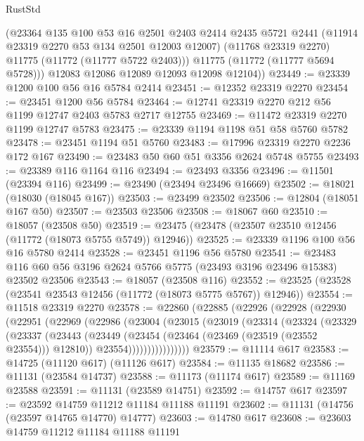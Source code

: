 \begin{lexlean}{RustStd}
\begin{coremodule}
          (@23364
            @135
            @100
            @53
            @16
            @2501
            @2403
            @2414
            @2435
            @5721
            @2441
            (@11914 @23319 @2270 @53 @134 @2501 @12003 @12007)
            (@11768 @23319 @2270)
            @11775
            (@11772 (@11777 @5722 @2403)))
          @11775
          (@11772 (@11777 @5694 @5728)))
        @12083
        @12086
        @12089
        @12093
        @12098
        @12104))
@23449 := @23339 @1200 @100 @56 @16 @5784 @2414
@23451 := @12352 @23319 @2270
@23454 := @23451 @1200 @56 @5784
@23464 := @12741 @23319 @2270 @212 @56 @1199 @12747 @2403 @5783 @2717 @12755
@23469 := @11472 @23319 @2270 @1199 @12747 @5783
@23475 := @23339 @1194 @1198 @51 @58 @5760 @5782
@23478 := @23451 @1194 @51 @5760
@23483 := @17996 @23319 @2270 @2236 @172 @167
@23490 := @23483 @50 @60 @51 @3356 @2624 @5748 @5755
@23493 := @23389 @116 @1164 @116
@23494 := @23493 @3356
@23496 := @11501 (@23394 @116)
@23499 := @23490 (@23494 @23496 @16669)
@23502 := @18021 (@18030 (@18045 @167))
@23503 := @23499 @23502
@23506 := @12804 (@18051 @167 @50)
@23507 := @23503 @23506
@23508 := @18067 @60
@23510 := @18057 (@23508 @50)
@23519 := @23475 (@23478 (@23507 @23510 @12456 (@11772 (@18073 @5755 @5749)) @12946))
@23525 := @23339 @1196 @100 @56 @16 @5780 @2414
@23528 := @23451 @1196 @56 @5780
@23541 := @23483 @116 @60 @56 @3196 @2624 @5766 @5775 (@23493 @3196 @23496 @15383) @23502 @23506
@23543 := @18057 (@23508 @116)
@23552 := @23525 (@23528 (@23541 @23543 @12456 (@11772 (@18073 @5775 @5767)) @12946))
@23554 := @11518 @23319 @2270
@23578 := @22860
    (@22885
      (@22926
        (@22928
          (@22930
            (@22951
              (@22969
                (@22986
                  (@23004
                    (@23015
                      (@23019
                        (@23314
                          (@23324
                            (@23329
                              (@23337
                                (@23443
                                  (@23449
                                    (@23454 (@23464 (@23469 (@23519 (@23552 @23554))) @12810))
                                    @23554))))))))))))))))
@23579 := @11114 @617
@23583 := @14725 (@11120 @617) (@11126 @617)
@23584 := @11135 @18682
@23586 := @11131 (@23584 @14737)
@23588 := @11173 (@11174 @617)
@23589 := @11169 @23588
@23591 := @11131 (@23589 @14751)
@23592 := @14757 @617
@23597 := @23592 @14759 @11212 @11184 @11188 @11191
@23602 := @11131 (@14756 (@23597 @14765 @14770) @14777)
@23603 := @14780 @617
@23608 := @23603 @14759 @11212 @11184 @11188 @11191

\end{coremodule}
\end{lexlean}
